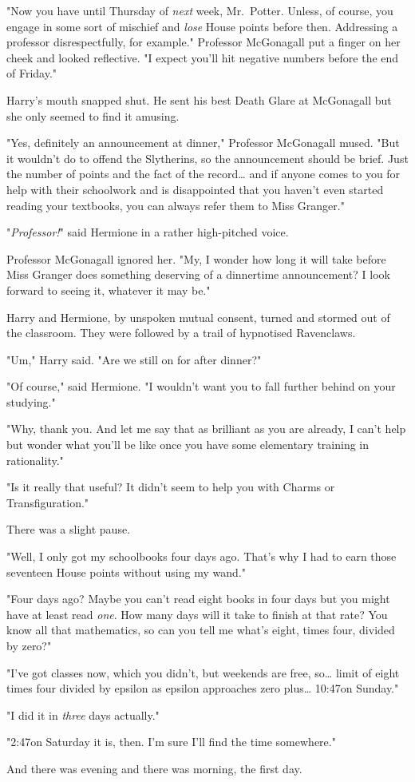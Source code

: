 "Now you have until Thursday of \emph{next} week, Mr.~Potter. Unless, of 
course, you engage in some sort of mischief and \emph{lose} House points before 
then. Addressing a professor disrespectfully, for example." Professor 
McGonagall put a finger on her cheek and looked reflective. "I expect you'll 
hit negative numbers before the end of Friday."

Harry's mouth snapped shut. He sent his best Death Glare at McGonagall but she 
only seemed to find it amusing.

"Yes, definitely an announcement at dinner," Professor McGonagall mused. "But 
it wouldn't do to offend the Slytherins, so the announcement should be brief. 
Just the number of points and the fact of the record{\ldots} and if anyone 
comes to you for help with their schoolwork and is disappointed that you 
haven't even started reading your textbooks, you can always refer them to Miss 
Granger."

"\emph{Professor!}" said Hermione in a rather high-pitched voice.

Professor McGonagall ignored her. "My, I wonder how long it will take before 
Miss Granger does something deserving of a dinnertime announcement? I look 
forward to seeing it, whatever it may be."

Harry and Hermione, by unspoken mutual consent, turned and stormed out of the 
classroom. They were followed by a trail of hypnotised Ravenclaws.

"Um," Harry said. "Are we still on for after dinner?"

"Of course," said Hermione. "I wouldn't want you to fall further behind on your 
studying."

"Why, thank you. And let me say that as brilliant as you are already, I can't 
help but wonder what you'll be like once you have some elementary training in 
rationality."

"Is it really that useful? It didn't seem to help you with Charms or 
Transfiguration."

There was a slight pause.

"Well, I only got my schoolbooks four days ago. That's why I had to earn those 
seventeen House points without using my wand."

"Four days ago? Maybe you can't read eight books in four days but you might 
have at least read \emph{one}. How many days will it take to finish at that 
rate? You know all that mathematics, so can you tell me what's eight, times 
four, divided by zero?"

"I've got classes now, which you didn't, but weekends are free, so{\ldots} 
limit of eight times four divided by epsilon as epsilon approaches zero 
plus{\ldots} 10:47\AM on Sunday."

"I did it in \emph{three} days actually."

"2:47\PM on Saturday it is, then. I'm sure I'll find the time somewhere."

And there was evening and there was morning, the first day.
